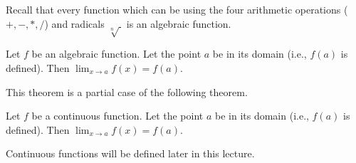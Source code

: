 \begin{frame}
Recall that every function which can be using the four arithmetic operations ($+,-,*,/$) and radicals $\sqrt[n]{~}$ is an algebraic function.  
\begin{theorem}
Let $f$ be an algebraic function. Let the point $a$ be in its domain (i.e., $f(a)$ is defined). Then $\displaystyle \lim_{x\to a}f(x) = f(a)$.
\end{theorem}
\pause
This theorem is a partial case of the following theorem.
\begin{theorem}
Let $f$ be a \alert<3>{continuous function}. Let the point $a$ be in its domain (i.e., $f(a)$ is defined). Then $\displaystyle \lim_{x\to a}f(x) = f(a)$.
\end{theorem}
\pause
\alert<3>{Continuous functions} will be defined later in this lecture.

\end{frame}
